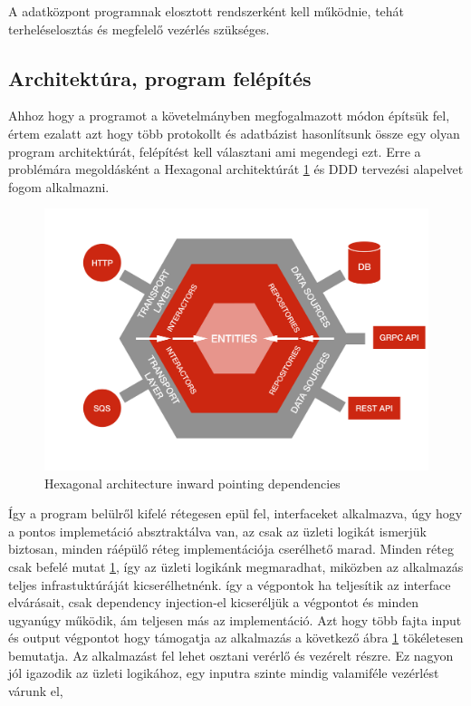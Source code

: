 A adatközpont programnak elosztott rendszerként kell működnie, tehát terheléselosztás és megfelelő vezérlés szükséges.
\subsection{Architektúra, program felépítés}
Ahhoz hogy a programot a követelmányben megfogalmazott módon építsük fel, értem ezalatt azt hogy több protokollt és adatbázist hasonlítsunk össze egy olyan
program architektúrát, felépítést kell választani ami megendegi ezt.
Erre a problémára megoldásként a Hexagonal architektúrát \ref{fig:hexagonal-inward} és DDD tervezési alapelvet fogom alkalmazni.
\begin{figure}[h]
    \centering
    \includegraphics[scale=0.07]{images/hexa-inward.png}
    \caption{Hexagonal architecture inward pointing dependencies}
    \label{fig:hexagonal-inward}
\end{figure}
Így a program belülről kifelé rétegesen epül fel, interfaceket alkalmazva, úgy hogy a pontos implemetáció absztraktálva van, az csak az üzleti logikát ismerjük biztosan, minden ráépülő réteg implementációja cserélhető marad.
Minden réteg csak befelé mutat \ref{fig:hexagonal-inward}, így az üzleti logikánk megmaradhat, miközben az alkalmazás teljes infrastuktúráját kicserélhetnénk.
így a végpontok ha teljesítik az interface elvárásait, csak dependency injection-el kicseréljük a végpontot és minden ugyanúgy működik, ám teljesen más az implementáció.
Azt hogy több fajta input és output végpontot hogy  támogatja az alkalmazás a következő ábra \ref{fig:hexagonal-inward} tökéletesen bemutatja.
Az alkalmazást fel lehet osztani verérlő és vezérelt részre. Ez nagyon jól igazodik az üzleti logikához, egy inputra szinte mindig valamiféle vezérlést várunk el,
